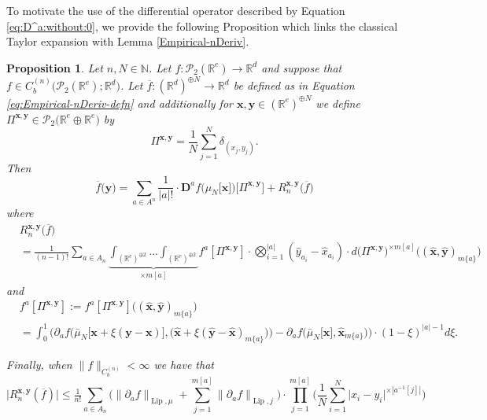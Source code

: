 \documentclass[a4paper,11pt,twoside]{article}
\numberwithin{equation}{section}
\theoremstyle{plain}
\newtheorem{proposition}[theorem]{Proposition}
\newcommand{\bN}{\mathbb{N}}
\newcommand{\bR}{\mathbb{R}}
\newcommand{\cP}{\mathcal{P}}
\newcommand{\rD}{\mathbf{D}}
\DeclareMathOperator{\lip}{Lip}
\newcommand{\1}{\mathbbm{1}}
\begin{document}
	To motivate the use of the differential operator described by Equation \eqref{eq:D^a:without:0}, we provide the following Proposition which links the classical Taylor expansion with Lemma \ref{Empirical-nDeriv}. 
	\begin{proposition}
		\label{proposition:classicTay<=>LionsTay}
		Let $n, N\in \bN$. Let $f: \cP_2(\bR^e) \to \bR^d$ and suppose that $f\in C_b^{(n)}\big( \cP_2(\bR^e); \bR^d\big)$. Let $\overline{f}: (\bR^d)^{\oplus N} \to \bR^d$ be defined as in Equation \eqref{eq:Empirical-nDeriv-defn} and additionally for $\boldsymbol{x}, \boldsymbol{y}\in (\bR^e)^{\oplus N}$ we define $\Pi^{\boldsymbol{x}, \boldsymbol{y}} \in \cP_2\big( \bR^e \oplus \bR^e \big)$ by
		\begin{equation}
			\label{eq:proposition:classicTay<=>LionsTay}
			\Pi^{\boldsymbol{x}, \boldsymbol{y}} = \frac{1}{N} \sum_{j=1}^N \delta_{(x_j, y_j)}. 
		\end{equation}
		Then
		\begin{equation}
			\label{eq:proposition:classicTay<=>LionsTay1}
			\overline{f}\Big( \boldsymbol{y} \Big) = \sum_{a\in A^n} \frac{1}{|a|!} \cdot \rD^a f\Big(\mu_N\big[ \boldsymbol{x} \big] \Big)\Big[ \Pi^{\boldsymbol{x}, \boldsymbol{y}} \Big]  + R_n^{\boldsymbol{x}, \boldsymbol{y}}\big( \overline{f} \big)
		\end{equation}
		where
		\begin{align}
			\nonumber
			&R_n^{\boldsymbol{x}, \boldsymbol{y}}\big(\overline{f} \big) 
			\\
			\label{eq:proposition:classicTay<=>LionsTayRem}
			&= \tfrac{1}{(n-1)!} \sum_{a\in A_n} \underbrace{\int_{(\bR^e)^{\oplus 2}} ... \int_{(\bR^e)^{\oplus 2}}}_{\times m[a]} f^a[\Pi^{\boldsymbol{x}, \boldsymbol{y}}] \cdot \bigotimes_{i=1}^{|a|} ( \hat{y}_{a_i} - \hat{x}_{a_i} ) \cdot d\big( \Pi^{\boldsymbol{x}, \boldsymbol{y}} \big)^{\times m[a]} \Big( (\hat{\boldsymbol{x}}, \hat{\boldsymbol{y}})_{m\{a\}} \Big)
		\end{align}
		and
		\begin{align*}
			&f^a[\Pi^{\boldsymbol{x}, \boldsymbol{y}}]:= f^a[\Pi^{\boldsymbol{x}, \boldsymbol{y}}]\Big( (\hat{\boldsymbol{x}}, \hat{\boldsymbol{y}})_{m\{a\}} \Big)
			\\
			&=\int_0^1 \bigg( \partial_a f\Big( \bar{\mu}_N\big[ \boldsymbol{x}+\xi(\boldsymbol{y}-\boldsymbol{x}) \big], \big( \hat{\boldsymbol{x}} + \xi(\hat{\boldsymbol{y}} - \hat{\boldsymbol{x}} )_{m\{a\}} \big) \Big) - \partial_a f\Big( \bar{\mu}_N\big[ \boldsymbol{x} \big], \hat{\boldsymbol{x}}_{m\{a\}} \Big) \bigg) \cdot (1-\xi)^{|a|-1} d\xi. 
		\end{align*}
	
		Finally, when $\| f \|_{C_b^{(n)}}< \infty$ we have that
		\begin{equation}
			\label{eq:proposition:classicTay<=>LionsTayRem+}
			\big| R_n^{\boldsymbol{x}, \boldsymbol{y}}( \overline{f} ) \big| \leq \tfrac{1}{n!} \sum_{a \in A_n} \Big( \big\| \partial_a f \big\|_{\lip, \mu} + \sum_{j=1}^{m[a]} \big\| \partial_a f \big\|_{\lip, j} \Big) \cdot \prod_{j=1}^{m[a]} \bigg( \frac{1}{N} \sum_{i=1}^N \big| x_i - y_i\big|^{\times |a^{-1}[j]|} \bigg)
		\end{equation}
	\end{proposition}
	
\end{document}
